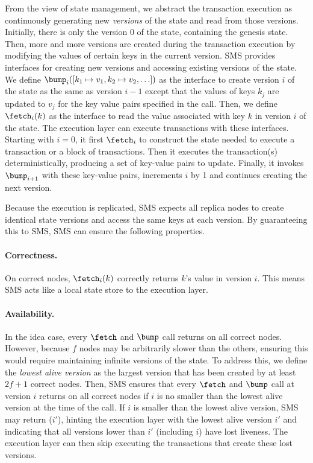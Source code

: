 From the view of state management, we abstract the transaction execution as continuously generating new \emph{versions} of the state and read from those versions.
Initially, there is only the version 0 of the state, containing the genesis state.
Then, more and more versions are created during the transaction execution by modifying the values of certain keys in the current version.
SMS provides interfaces for creating new versions and accessing existing versions of the state.
We define $\bump_{i}([k_1 \mapsto v_1, k_2 \mapsto v_2, \ldots])$ as the interface to create version $i$ of the state as the same as version $i-1$ except that the values of keys $k_j$ are updated to $v_j$ for the key value pairs specified in the call.
Then, we define $\fetch_{i}(k)$ as the interface to read the value associated with key $k$ in version $i$ of the state.
The execution layer can execute transactions with these interfaces.
Starting with $i=0$, it first $\fetch_{i}$ to construct the state needed to execute a transaction or a block of transactions.
Then it executes the transaction(s) deterministically, producing a set of key-value pairs to update.
Finally, it invokes $\bump_{i+1}$ with these key-value pairs, increments $i$ by 1 and continues creating the next version.

Because the execution is replicated, SMS expects all replica nodes to create identical state versions and access the same keys at each version.
By guaranteeing this to SMS, SMS can ensure the following properties.

\paragraph{Correctness.}
On correct nodes, $\fetch_{i}(k)$ correctly returns $k$'s value in version $i$.
This means SMS acts like a local state store to the execution layer.

\paragraph{Availability.}
In the idea case, every $\fetch$ and $\bump$ call returns on all correct nodes.
However, because $f$ nodes may be arbitrarily slower than the others, ensuring this would require maintaining infinite versions of the state.
To address this, we define the \emph{lowest alive version} as the largest version that has been created by at least $2f+1$ correct nodes.
Then, SMS ensures that every $\fetch$ and $\bump$ call at version $i$ returns on all correct nodes if $i$ is no smaller than the lowest alive version at the time of the call.
If $i$ is smaller than the lowest alive version, SMS may return \forward($i'$), hinting the execution layer with the lowest alive version $i'$ and indicating that all versions lower than $i'$ (including $i$) have lost liveness.
The execution layer can then skip executing the transactions that create these lost versions.

